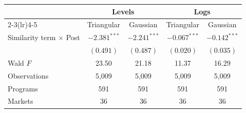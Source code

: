 \begin{tabular}{lcccc}
\toprule
& \multicolumn{2}{c}{Levels} & \multicolumn{2}{c}{Logs} \\
\cmidrule(lr){2-3}\cmidrule(lr){4-5}
& Triangular & Gaussian & Triangular & Gaussian \\
\midrule
Similarity term \(\times\) Post & \(-2.381^{***}\) & \(-2.241^{***}\) & \(-0.067^{***}\) & \(-0.142^{***}\) \\
 & \((0.491)\) & \((0.487)\) & \((0.020)\) & \((0.035)\) \\
Wald \(F\) & 23.50 & 21.18 & 11.37 & 16.29 \\
Observations &     5,009 &     5,009 &     5,009 &     5,009 \\
Programs &       591 &       591 &       591 &       591 \\
Markets &        36 &        36 &        36 &        36 \\
\bottomrule
\end{tabular}
